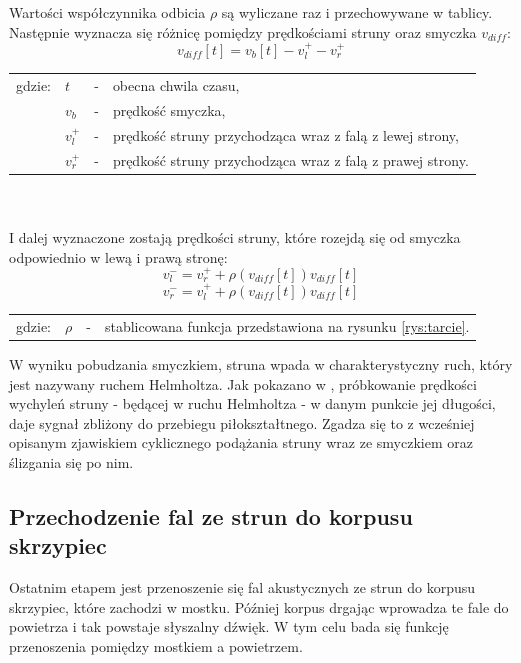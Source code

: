 Wartości współczynnika odbicia $\rho$ są wyliczane raz i przechowywane w tablicy. Następnie wyznacza się różnicę pomiędzy prędkościami struny oraz smyczka $v_{diff}$:
\begin{equation} \label{equ:wzor1}
v_{diff}[t] = v_b[t] - v_{l}^{+} - v_{r}^{+}
\end{equation}
\begin{tabular}{ l l l l}
	gdzie: & $t$ &  - & obecna chwila czasu, \\
	&	$v_b$ & - &  prędkość smyczka, \\
	&	$v_{l}^{+}$ & - & prędkość struny przychodząca wraz z falą z lewej strony,\\
	&	$v_{r}^{+}$ & - &  prędkość struny przychodząca wraz z falą z prawej strony.\\
\end{tabular} \\ \\
I dalej wyznaczone zostają prędkości struny, które rozejdą się od smyczka odpowiednio w lewą i prawą stronę:
\begin{equation} \label{equ:wzor2}
v_{l}^{-} = v_r^{+} +  \rho(v_{diff}[t])v_{diff}[t]
\end{equation}
\begin{equation} \label{equ:wzor3}
v_{r}^{-} = v_l^{+} +  \rho(v_{diff}[t])v_{diff}[t]
\end{equation}
\begin{tabular}{ l l l l}
	gdzie: & $\rho$ &  - & stablicowana funkcja przedstawiona na rysunku \ref{rys:tarcie}. \\
	
\end{tabular}
\vspace{6pt}

W wyniku pobudzania smyczkiem, struna wpada w charakterystyczny ruch, który jest nazywany ruchem Helmholtza. Jak pokazano w \cite{bowed_2}, próbkowanie prędkości wychyleń struny - będącej w ruchu Helmholtza - w danym punkcie jej długości, daje sygnał zbliżony do przebiegu piłokształtnego. Zgadza się to z wcześniej opisanym zjawiskiem cyklicznego podążania struny wraz ze smyczkiem oraz ślizgania się po nim.

\subsection{Przechodzenie fal ze strun do korpusu skrzypiec} 

Ostatnim etapem jest przenoszenie się fal akustycznych ze strun do korpusu skrzypiec, które zachodzi w mostku. Później korpus drgając wprowadza te fale do powietrza i tak powstaje słyszalny dźwięk. W tym celu bada się funkcję przenoszenia pomiędzy mostkiem a powietrzem. 

